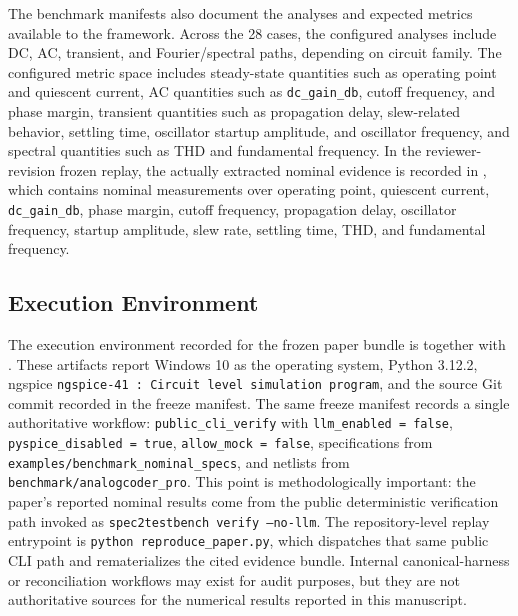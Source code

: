 The benchmark manifests also document the analyses and expected metrics available to the framework. Across the 28 cases, the configured analyses include DC, AC, transient, and Fourier/spectral paths, depending on circuit family. The configured metric space includes steady-state quantities such as operating point and quiescent current, AC quantities such as \texttt{dc\_gain\_db}, cutoff frequency, and phase margin, transient quantities such as propagation delay, slew-related behavior, settling time, oscillator startup amplitude, and oscillator frequency, and spectral quantities such as THD and fundamental frequency. In the reviewer-revision frozen replay, the actually extracted nominal evidence is recorded in , which contains nominal measurements over operating point, quiescent current, \texttt{dc\_gain\_db}, phase margin, cutoff frequency, propagation delay, oscillator frequency, startup amplitude, slew rate, settling time, THD, and fundamental frequency.

\subsection{Execution Environment}
The execution environment recorded for the frozen paper bundle is  together with . These artifacts report Windows 10 as the operating system, Python 3.12.2, ngspice \texttt{ngspice-41 : Circuit level simulation program}, and the source Git commit recorded in the freeze manifest. The same freeze manifest records a single authoritative workflow: \texttt{public\_cli\_verify} with \texttt{llm\_enabled = false}, \texttt{pyspice\_disabled = true}, \texttt{allow\_mock = false}, specifications from \texttt{examples/benchmark\_nominal\_specs}, and netlists from \texttt{benchmark/analogcoder\_pro}. This point is methodologically important: the paper's reported nominal results come from the public deterministic verification path invoked as \texttt{spec2testbench verify --no-llm}. The repository-level replay entrypoint is \texttt{python reproduce\_paper.py}, which dispatches that same public CLI path and rematerializes the cited evidence bundle. Internal canonical-harness or reconciliation workflows may exist for audit purposes, but they are not authoritative sources for the numerical results reported in this manuscript.

